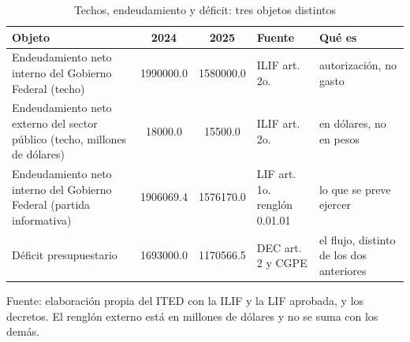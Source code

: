 \begin{table}[htbp]
\centering
\caption{Techos, endeudamiento y déficit: tres objetos distintos}
\label{tab:C12_3}
\small
\setlength{\tabcolsep}{4pt}
\begin{tabular}{L{4.4cm}SSL{2.5cm}L{2.9cm}}
\toprule
{Objeto} & {2024} & {2025} & {Fuente} & {Qué es} \\
\midrule
{Endeudamiento neto interno del Gobierno Federal (techo)} & \num{1990000.0} & \num{1580000.0} & {ILIF art. 2o.} & {autorización, no gasto} \\
{Endeudamiento neto externo del sector público (techo, millones de dólares)} & \num{18000.0} & \num{15500.0} & {ILIF art. 2o.} & {en dólares, no en pesos} \\
{Endeudamiento neto interno del Gobierno Federal (partida informativa)} & \num{1906069.4} & \num{1576170.0} & {LIF art. 1o. renglón 0.01.01} & {lo que se preve ejercer} \\
{Déficit presupuestario} & \num{1693000.0} & \num{1170566.5} & {DEC art. 2 y CGPE} & {el flujo, distinto de los dos anteriores} \\
\bottomrule
\end{tabular}
\par\vspace{2pt}\footnotesize Fuente: elaboración propia del ITED con la ILIF y la LIF aprobada, y los decretos. El renglón externo está en millones de dólares y no se suma con los demás.
\end{table}
